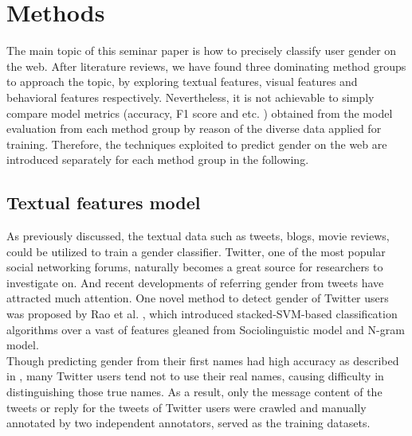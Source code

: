 \documentclass[runningheads]{llncs}
\begin{document}
	
	\section{Methods}
	
	The main topic of this seminar paper is how to precisely classify user gender on the web. After literature reviews, we have found three dominating method groups to approach the topic, by exploring textual features, visual features and behavioral features respectively. Nevertheless, it is not achievable to simply compare model metrics (accuracy, F1 score and etc. ) obtained from the model evaluation from each method group by reason of the diverse data applied for training. Therefore, the techniques exploited to predict gender on the web are introduced separately for each method group in the following. 
	
	\subsection{Textual features model}
	
	As previously discussed, the textual data such as tweets, blogs, movie reviews, could be utilized to train a gender classifier. Twitter, one of the most popular social networking forums, naturally becomes a great source for researchers to investigate on. And recent developments of referring gender from tweets have attracted much attention. One novel method to detect gender of Twitter users was proposed by Rao et al. \cite{rao2010classifying}, which introduced stacked-SVM-based classification algorithms over a vast of features gleaned from Sociolinguistic model and N-gram model.  \\
	Though predicting gender from their first names had high accuracy as described in \cite{karimi2016inferring}, many Twitter users tend not to use their real names, causing difficulty in distinguishing those true names. As a result, only the message content of the tweets or reply for the tweets of Twitter users were crawled and manually annotated by two independent annotators, served as the training datasets.  \\
	
\end{document}
